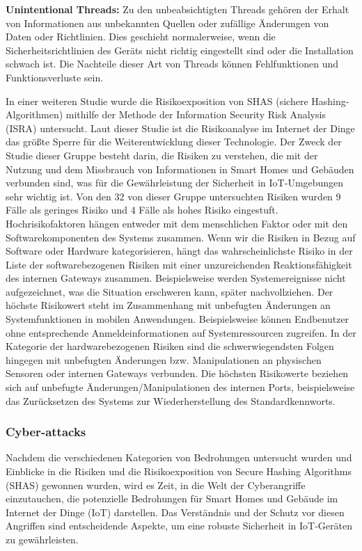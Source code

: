 \textbf{Unintentional Threads:} 
Zu den unbeabsichtigten Threads gehören der Erhalt von Informationen aus unbekannten Quellen oder zufällige Änderungen von Daten oder Richtlinien. Dies geschieht normalerweise, wenn die Sicherheitsrichtlinien des Geräts nicht richtig eingestellt sind oder die Installation schwach ist. Die Nachteile dieser Art von Threads können Fehlfunktionen und Funktionsverluste sein.

In einer weiteren Studie \cite{JACOBSSON2016719} wurde die Risikoexposition von SHAS (sichere Hashing-Algorithmen) mithilfe der Methode der Information Security Risk Analysis (ISRA) untersucht.
Laut dieser Studie ist die Risikoanalyse im Internet der Dinge das größte Sperre für die Weiterentwicklung dieser Technologie. Der Zweck der Studie dieser Gruppe besteht darin, die Risiken zu verstehen, die mit der Nutzung und dem Missbrauch von Informationen in Smart Homes und Gebäuden verbunden sind, was für die Gewährleistung der Sicherheit in IoT-Umgebungen sehr wichtig ist. Von den 32 von dieser Gruppe untersuchten Risiken wurden 9 Fälle als geringes Risiko und 4 Fälle als hohes Risiko eingestuft. Hochrisikofaktoren hängen entweder mit dem menschlichen Faktor oder mit den Softwarekomponenten des Systems zusammen. 
Wenn wir die Risiken in Bezug auf Software oder Hardware kategorisieren, hängt das wahrscheinlichste Risiko in der Liste der softwarebezogenen Risiken mit einer unzureichenden Reaktionsfähigkeit des internen Gateways zusammen. Beispielsweise werden Systemereignisse nicht aufgezeichnet, was die Situation erschweren kann, später nachvollziehen. Der höchste Risikowert steht im Zusammenhang mit unbefugten Änderungen an Systemfunktionen in mobilen Anwendungen. Beispielsweise können Endbenutzer ohne entsprechende Anmeldeinformationen auf Systemressourcen zugreifen.
In der Kategorie der hardwarebezogenen Risiken sind die schwerwiegendsten Folgen hingegen mit unbefugten Änderungen bzw. Manipulationen an physischen Sensoren oder internen Gateways verbunden. Die höchsten Risikowerte beziehen sich auf unbefugte Änderungen/Manipulationen des internen Ports, beispielsweise das Zurücksetzen des Systems zur Wiederherstellung des Standardkennworts.

\subsubsection{Cyber-attacks}

Nachdem die verschiedenen Kategorien von Bedrohungen untersucht wurden und Einblicke in die Risiken und die Risikoexposition von Secure Hashing Algorithms (SHAS) gewonnen wurden, wird es Zeit, in die Welt der Cyberangriffe einzutauchen, die potenzielle Bedrohungen für Smart Homes und Gebäude im Internet der Dinge (IoT) darstellen. Das Verständnis und der Schutz vor diesen Angriffen sind entscheidende Aspekte, um eine robuste Sicherheit in IoT-Geräten zu gewährleisten.

